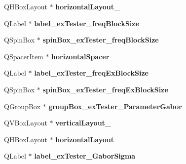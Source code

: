 \begin{DoxyCompactItemize}
Q\+H\+Box\+Layout $\ast$ {\bfseries horizontal\+Layout\+\_}
\item 
\mbox{\label{class_ui___main_window_afadf69fe8cb116215cbb61faf760ffa3}} 
Q\+Label $\ast$ {\bfseries label\+\_\+ex\+Tester\+\_\+freq\+Block\+Size}
\item 
\mbox{\label{class_ui___main_window_a81d2c5ff61c389b9ae44db3d57fa4784}} 
Q\+Spin\+Box $\ast$ {\bfseries spin\+Box\+\_\+ex\+Tester\+\_\+freq\+Block\+Size}
\item 
\mbox{\label{class_ui___main_window_a172cf968930f578fca5cf3eec4e3ee39}} 
Q\+Spacer\+Item $\ast$ {\bfseries horizontal\+Spacer\+\_}
\item 
\mbox{\label{class_ui___main_window_ab8c893aa659ad1b4882aed920d1cba25}} 
Q\+Label $\ast$ {\bfseries label\+\_\+ex\+Tester\+\_\+freq\+Ex\+Block\+Size}
\item 
\mbox{\label{class_ui___main_window_adf75c89eb1fa317c9d552be59f801dc6}} 
Q\+Spin\+Box $\ast$ {\bfseries spin\+Box\+\_\+ex\+Tester\+\_\+freq\+Ex\+Block\+Size}
\item 
\mbox{\label{class_ui___main_window_ae02830c946654fb9875cd6c7914af440}} 
Q\+Group\+Box $\ast$ {\bfseries group\+Box\+\_\+ex\+Tester\+\_\+\+Parameter\+Gabor}
\item 
\mbox{\label{class_ui___main_window_abffb54fb984e9efbb7feceb892bfbf01}} 
Q\+V\+Box\+Layout $\ast$ {\bfseries vertical\+Layout\+\_}
\item 
\mbox{\label{class_ui___main_window_a17fe36cd2761bd56008536f9da5a4dc0}} 
Q\+H\+Box\+Layout $\ast$ {\bfseries horizontal\+Layout\+\_}
\item 
\mbox{\label{class_ui___main_window_ae44fd2cf86c0d2655f401885fcb05a38}} 
Q\+Label $\ast$ {\bfseries label\+\_\+ex\+Tester\+\_\+\+Gabor\+Sigma}
\item 
\mbox{\label{class_ui___main_window_aa9817fa32d79121347bc0673dbc5260e}} 

\end{DoxyCompactItemize}
